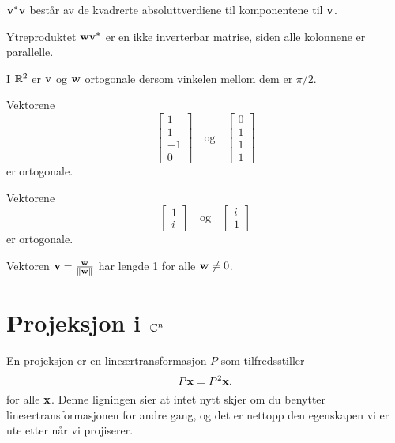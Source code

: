  
\begin{merkx}
$\mathbf{v}^*\mathbf{v}$ består av de kvadrerte absoluttverdiene til komponentene til $\mathbf{v}$. 
\end{merkx}
 
 \begin{merkx}
 Ytreproduktet $ \mathbf{w} \mathbf{v}^*$ er en ikke inverterbar matrise, siden alle kolonnene er parallelle.
 \end{merkx}
 
 

 \begin{ex}
I $\mathbb{R}^2$ er $\mathbf{v}$ og $\mathbf{w}$ ortogonale dersom vinkelen mellom dem er $\pi/2$.
\end{ex}


 \begin{ex}
 Vektorene 
 \[
 \begin{bmatrix}
 1 \\ 
 1 \\
 -1\\
 0
 \end{bmatrix}
 \quad
 \text{og}
 \quad
  \begin{bmatrix}
 0 \\ 
 1 \\
 1\\
 1
 \end{bmatrix}
\]
er ortogonale. 
 \end{ex}

 \begin{ex}
 Vektorene 
 \[
 \begin{bmatrix}
 1 \\ 
 i 
 \end{bmatrix}
 \quad
 \text{og}
 \quad
  \begin{bmatrix}
 i \\ 
1
 \end{bmatrix}
\]
er ortogonale. 
 \end{ex}


 \begin{ex}
 Vektoren $\mathbf{v}=\frac{\mathbf{w}}{\|\mathbf{w}\|}$ har lengde 1 for alle $\mathbf{w} \neq 0$.
 \end{ex}



 \section*{Projeksjon i $\mathbb{C}^n$}
En projeksjon er en lineærtransformasjon $P$ som tilfredsstiller
\[
 P\mathbf{x}=P^2\mathbf{x}.
 \]
 for alle $\mathbf{x}$. Denne ligningen sier at intet nytt skjer om du benytter lineærtransformasjonen for andre gang, 
 og det er nettopp den egenskapen vi er ute etter når vi projiserer. 
 
